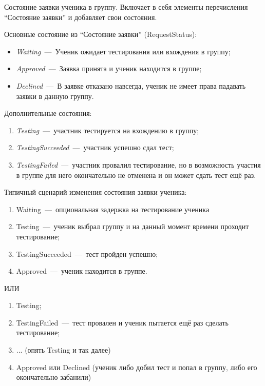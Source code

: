 \documentclass[14pt]{article}
\begin{document}
Состояние заявки ученика в группу. Включает в себя элементы перечисления ``Состояние заявки'' и добавляет свои состояния.

Основные состояние из ``Состояние заявки'' (RequestStatus):

\begin{itemize}
	\item \emph{Waiting}~---~Ученик ожидает тестирования или вхождения в группу;
	\item \emph{Approved}~---~Заявка принята и ученик находится в группе;
	\item \emph{Declined}~---~В заявке отказано навсегда, ученик не имеет права падавать заявки в данную группу.
\end{itemize}

Дополнительные состояния:
\begin{enumerate}
	\item \emph{Testing}~---~участник тестируется на вхождению в группу;
	\item \emph{TestingSucceeded}~---~участник успешно сдал тест;
	\item \emph{TestingFailed}~---~участник провалил тестирование, но в возможность участия в группе для него окончательно не отменена и он может сдать тест ещё раз.
\end{enumerate}

Типичный сценарий изменения состояния заявки ученика:

\begin{enumerate}
	\item Waiting~---~опциональная задержка на тестирование ученика
	\item Testing~---~ученик выбрал группу и на данный момент времени проходит тестирование;
	\item TestingSucceeded~---~тест пройден успешно;
	\item Approved~---~ученик находится в группе.
\end{enumerate}

ИЛИ

\begin{enumerate}
	\item Testing;
	\item TestingFailed~---~тест провален и ученик пытается ещё раз сделать тестирование;
	\item ... (опять Testing и так далее)
	\item Approved или Declined (ученик либо добил тест и попал в группу, либо его окончательно забанили)
\end{enumerate}
\end{document}
